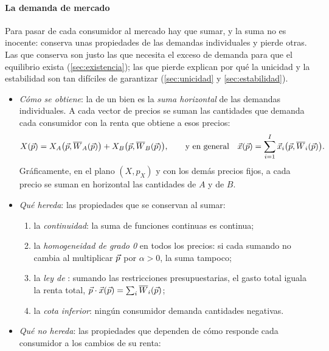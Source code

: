 \documentclass[11pt]{article}
\begin{document}
\paragraph{La demanda de mercado}

Para pasar de cada consumidor al mercado hay que sumar, y la suma no es inocente: conserva unas propiedades de las demandas individuales y pierde otras. Las que conserva son justo las que necesita el exceso de demanda para que el equilibrio exista (\ref{sec:existencia}); las que pierde explican por qué la unicidad y la estabilidad son tan difíciles de garantizar (\ref{sec:unicidad} y \ref{sec:estabilidad}).

\begin{itemize}
\item \emph{Cómo se obtiene}: la  de un bien es la \emph{suma horizontal} de las demandas individuales. A cada vector de precios se suman las cantidades que demanda cada consumidor con la renta que obtiene a esos precios:
  \begin{equation}
  X(\vec{p})=X_A\big(\vec{p},\overline{W}_A(\vec{p})\big)+X_B\big(\vec{p},\overline{W}_B(\vec{p})\big),\qquad\text{y en general}\quad \vec{x}(\vec{p})=\sum_{i=1}^{I}\vec{x}_i\big(\vec{p},\overline{W}_i(\vec{p})\big). \label{eq:demanda-mercado}
  \end{equation}
  Gráficamente, en el plano $(X,p_X)$ y con los demás precios fijos, a cada precio se suman en horizontal las cantidades de $A$ y de $B$.
\item \emph{Qué hereda}: las propiedades que se conservan al sumar:
  \begin{enumerate}
  \item la \emph{continuidad}: la suma de funciones continuas es continua;
  \item la \emph{homogeneidad de grado 0} en todos los precios: si cada sumando no cambia al multiplicar $\vec{p}$ por $\alpha>0$, la suma tampoco;
  \item la \emph{ley de }: sumando las restricciones presupuestarias, el gasto total iguala la renta total, $\vec{p}\cdot\vec{x}(\vec{p})=\sum_i\overline{W}_i(\vec{p})$;
  \item la \emph{cota inferior}: ningún consumidor demanda cantidades negativas.
  \end{enumerate}
\item \emph{Qué no hereda}: las propiedades que dependen de cómo responde cada consumidor a los cambios de su renta:
  \begin{enumerate}

\end{enumerate}
\end{itemize}
\end{document}
